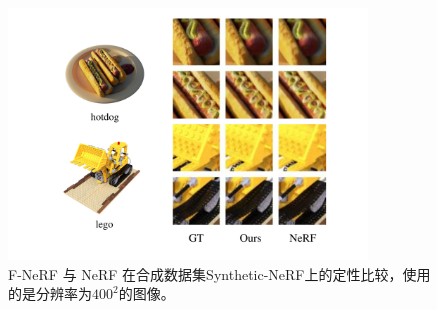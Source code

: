 \begin{figure}[tbhp]
    \centering
    \includegraphics[width=0.85\textwidth]{figures/synthetic.pdf}
    \caption{F-NeRF 与 NeRF 在合成数据集Synthetic-NeRF上的定性比较，使用的是分辨率为$400^2$的图像。}
    \label{fig:synthetic}
\end{figure}


